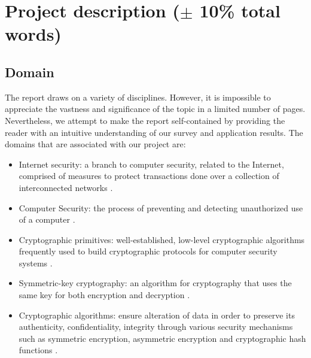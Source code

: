 \section{Project description ($\pm$ 10\% total words) }
\subsection{Domain}
The report draws on a variety of disciplines. However, it is impossible to appreciate the vastness and significance of the topic in a limited number of pages. Nevertheless, we attempt to make the report self-contained by providing the reader with an intuitive understanding of our survey and application results.
The domains that are associated with our project are: 
\begin{itemize}
\item Internet security: a branch to computer security, related to the Internet, comprised of measures to protect transactions done over a collection of interconnected networks \cite{is}.
\end {itemize}
\begin{itemize} 
\item Computer Security: the process of preventing and detecting unauthorized use of a computer \cite{cs}. 
\end{itemize}
\begin{itemize}
\item Cryptographic primitives:  well-established, low-level cryptographic algorithms frequently used to build cryptographic protocols for computer security systems \cite{cp}.
\end{itemize}
\begin{itemize}
\item Symmetric-key cryptography: an algorithm for cryptography that uses the same key for both encryption and decryption \cite{ska}.
\end{itemize}
\begin{itemize}
\item Cryptographic algorithms: ensure alteration of data in order to preserve its authenticity, confidentiality, integrity through various security mechanisms such as symmetric encryption,  asymmetric encryption and cryptographic hash functions \cite{wikicrypto}.
\end{itemize}




